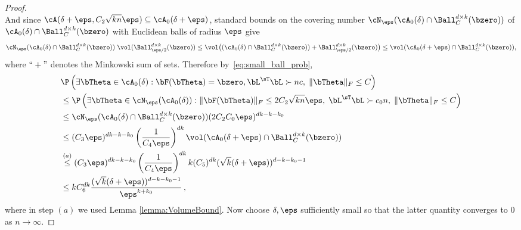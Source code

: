 \begin{proof}
\begin{equation}
\end{equation}
And since $\cA(\delta + \eps , C_2 \sqrt{k n} \eps) \subseteq \cA_0(\delta +\eps)$, standard bounds on the covering number $\cN_{\eps}( \cA_0(\delta)\cap\Ball_{C}^{d\times k}(\bzero))$ of $\cA_0(\delta)\cap\Ball_{C}^{d\times k}(\bzero)$ with Euclidean balls of radius $\eps$ give
\begin{equation}
   \cN_\eps(
   \cA_0(\delta)\cap\Ball_C^{d\times k}(\bzero))\;
   \vol(\Ball_{\eps/2}^{d\times k}(\bzero))  \le  \vol\big((\cA_0(\delta)\cap\Ball_C^{d\times k}(\bzero)) + \Ball_{\eps/2}^{d\times k}(\bzero)\big) 
   \le   \vol(\cA_0(\delta +\eps)\cap\Ball_C^{d\times k}(\bzero)),
\end{equation}
where $``+"$ denotes the Minkowski sum of sets.
Therefore by~\eqref{eq:small_ball_prob}, 
%
\begin{align*}
   &\P\left(\exists \bTheta \in \cA_0(\delta) : \bF(\bTheta) = \bzero, \bL^\sT\bL \succ n c,\; \|\bTheta\|_F \le C\right)   \\
  &\le 
  \P\left(
  \exists \bTheta \in \cN_\eps(\cA_0(\delta)) : \|\bF(\bTheta)\|_F \le 2 C_2 \sqrt{kn} \eps, \;
  \bL^\sT \bL \succ c_0 n,\; 
  \|\bTheta\|_F \le C
  \right)\\
  &\le \cN_\eps(\cA_0(\delta) \cap\Ball_C^{d\times k}(\bzero)) (2 C_2 C_0 \eps)^{dk - k - k_0}\\
  &\le (C_3 \eps)^{dk - k- k_0} \left(\frac{1}{C_4 \eps}\right)^{dk}   \vol(\cA_0(\delta +\eps) \cap \Ball_{C}^{d\times k}(\bzero))\\
  &\stackrel{(a)}{\le} (C_3 \eps)^{dk - k- k_0} \left(\frac{1}{C_4 \eps}\right)^{dk}  k (C_5)^{dk}  (\sqrt {k} (\delta + \eps) )^{d -k -k_0 -1}\\
  &\le k C_6^{dk} \frac{(\sqrt{k}(\delta+\eps))^{d-k-k_0-1}}{\eps^{k+k_0}}\, ,
\end{align*}
where in step $(a)$ we used Lemma \ref{lemma:VolumeBound}. 
Now choose $\delta,\eps$ sufficiently small so that the latter quantity converges to $0$ as $n\to\infty.$



\end{proof}


%


